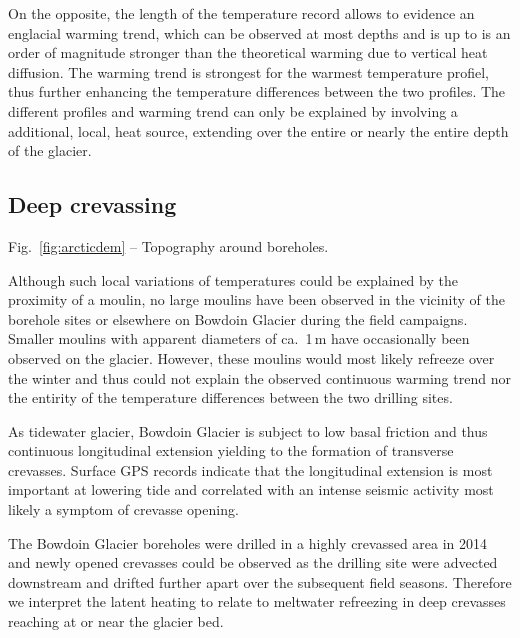 \documentclass[utf8]{article}
\begin{document}
    On the opposite, the length of the temperature record allows to evidence an
    englacial warming trend, which can be observed at most depths and is up to
    is an order of magnitude stronger than the theoretical warming due to
    vertical heat diffusion. The warming trend is strongest for the warmest
    temperature profiel, thus further enhancing the temperature differences
    between the two profiles. The different profiles and warming trend can only
    be explained by involving a additional, local, heat source, extending over
    the entire or nearly the entire depth of the glacier.


\subsection{Deep crevassing}

    Fig.~\ref{fig:arcticdem} -- Topography around boreholes.

    Although such local variations of temperatures could be explained by the
    proximity of a moulin, no large moulins have been observed in the vicinity
    of the borehole sites or elsewhere on Bowdoin Glacier during the field
    campaigns. Smaller moulins with apparent diameters of ca.~1\,m have
    occasionally been observed on the glacier. However, these moulins would
    most likely refreeze over the winter and thus could not explain the
    observed continuous warming trend nor the entirity of the temperature
    differences between the two drilling sites.

    As tidewater glacier, Bowdoin Glacier is subject to low basal friction and
    thus continuous longitudinal extension yielding to the formation of
    transverse crevasses. Surface GPS records indicate that the longitudinal
    extension is most important at lowering tide and correlated with an intense
    seismic activity most likely a symptom of crevasse opening.

    The Bowdoin Glacier boreholes were drilled in a highly crevassed area in
    2014 and newly opened crevasses could be observed as the drilling site were
    advected downstream and drifted further apart over the subsequent field
    seasons. Therefore we interpret the latent heating to relate to meltwater
    refreezing in deep crevasses reaching at or near the glacier bed.


\end{document}
